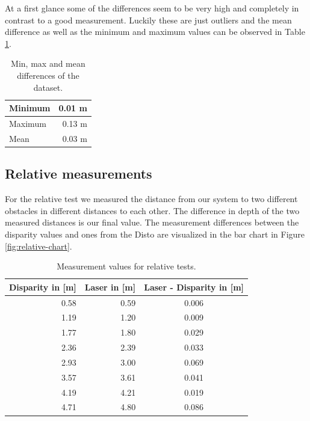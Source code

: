 \documentclass[11pt]{article}
\begin{document}
At a first glance some of the differences seem to be very high and completely in contrast to a good measurement. Luckily these are just outliers and the mean difference as well as the minimum and maximum values can be observed in Table \ref{table:absolute-results}.

\begin{table}[htbp]
	\begin{center}
	\begin{tabular}{|l|r|}
	\hline
	Minimum & 0.01 m \\ \hline
	Maximum & 0.13 m \\ \hline
	Mean & 0.03 m\\ \hline
	\end{tabular}
	\end{center}
	\caption{Min, max and mean differences of the dataset.}
	\label{table:absolute-results}
\end{table}

\subsection{Relative measurements}
For the relative test we measured the distance from our system to two different obstacles in different distances to each other. The difference in depth of the two measured distances is our final value. The measurement differences between the disparity values and ones from the Disto are visualized in the bar chart in Figure \ref{fig:relative-chart}.

\begin{table}[htbp]
	\begin{center}
	\begin{tabular}{|r|r|c|}
	\hline
	\multicolumn{1}{|l|}{Disparity in [m]} & \multicolumn{1}{l|}{Laser in [m]} & \multicolumn{1}{l|}{Laser - Disparity in [m]} \\ \hline
	0.58 & 0.59 & 0.006 \\ \hline
	1.19 & 1.20 & 0.009 \\ \hline
	1.77 & 1.80 & 0.029 \\ \hline
	2.36 & 2.39 & 0.033 \\ \hline
	2.93 & 3.00 & 0.069 \\ \hline
	3.57 & 3.61 & 0.041 \\ \hline
	4.19 & 4.21 & 0.019 \\ \hline
	4.71 & 4.80 & 0.086 \\ \hline
	\end{tabular}
	\end{center}
	\caption{Measurement values for relative tests.}
	\label{table:relative-table}
\end{table}
\end{document}
